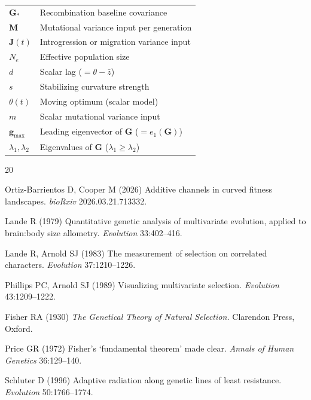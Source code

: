 \documentclass[11pt]{article}
\newcommand{\vect}[1]{\boldsymbol{#1}}
\newcommand{\mat}[1]{\mathbf{#1}}
\begin{document}
\begin{table}[ht]
\begin{tabularx}{\textwidth}{lX}
$\mat{G}_*$          & Recombination baseline covariance \\
$\mat{M}$            & Mutational variance input per generation \\
$\mat{J}(t)$         & Introgression or migration variance input \\
$N_e$                & Effective population size \\
$d$                  & Scalar lag ($= \theta - \bar{z}$) \\
$s$                  & Stabilizing curvature strength \\
$\theta(t)$          & Moving optimum (scalar model) \\
$m$                  & Scalar mutational variance input \\
$\vect{g}_{\max}$    & Leading eigenvector of $\mat{G}$
                       ($= e_1(\mat{G})$) \\
$\lambda_1, \lambda_2$ & Eigenvalues of $\mat{G}$
                       ($\lambda_1 \geq \lambda_2$) \\
\bottomrule
\end{tabularx}
\end{table}



\begin{thebibliography}{20}

Ortiz-Barrientos D, Cooper M (2026)
Additive channels in curved fitness landscapes.
\textit{bioRxiv} 2026.03.21.713332.

Lande R (1979)
Quantitative genetic analysis of multivariate evolution, applied
to brain:body size allometry.
\textit{Evolution} 33:402--416.

Lande R, Arnold SJ (1983)
The measurement of selection on correlated characters.
\textit{Evolution} 37:1210--1226.

Phillips PC, Arnold SJ (1989)
Visualizing multivariate selection.
\textit{Evolution} 43:1209--1222.

Fisher RA (1930)
\textit{The Genetical Theory of Natural Selection.}
Clarendon Press, Oxford.

Price GR (1972)
Fisher's `fundamental theorem' made clear.
\textit{Annals of Human Genetics} 36:129--140.

Schluter D (1996)
Adaptive radiation along genetic lines of least resistance.
\textit{Evolution} 50:1766--1774.

\end{thebibliography}
\end{document}
